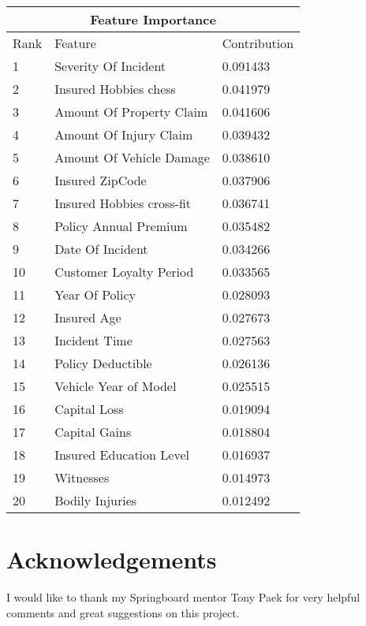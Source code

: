 \documentclass[oneside,12pt,reqno]{amsart}
\theoremstyle{definition}
\begin{document}
\vspace{0.2in}
\begin{tabular}{ |p{3cm}|p{8cm}|p{2.5cm}|  }
 \hline
 \multicolumn{3}{|c|}{Feature Importance} \\
 \hline
Rank& Feature & Contribution\\
 \hline
1 & Severity Of Incident   &       0.091433\\
2 & Insured Hobbies chess  &      0.041979\\
3 & Amount Of Property Claim  &     0.041606\\
4 & Amount Of Injury Claim   &      0.039432\\
5 & Amount Of Vehicle Damage  &     0.038610\\
6 & Insured ZipCode        &      0.037906\\
7 & Insured Hobbies cross-fit &   0.036741\\
8 & Policy Annual Premium &        0.035482\\
9 & Date Of Incident    &          0.034266\\
10 & Customer Loyalty Period    &   0.033565\\
11 & Year Of Policy   &             0.028093\\
12 & Insured Age   &               0.027673\\
13 & Incident Time   &             0.027563\\
14 & Policy Deductible   &        0.026136\\
15 & Vehicle Year of Model  &                0.025515\\
16 &Capital Loss  &               0.019094\\
17 & Capital Gains &               0.018804\\
18 & Insured Education Level  &     0.016937\\
19 & Witnesses      &             0.014973\\
20 & Bodily Injuries &              0.012492\\
 \hline
\end{tabular}

\vspace{0.2in}

\section{Acknowledgements} 
I would like to thank my Springboard mentor Tony Paek for very helpful comments and great suggestions on this project.

\end{document}
